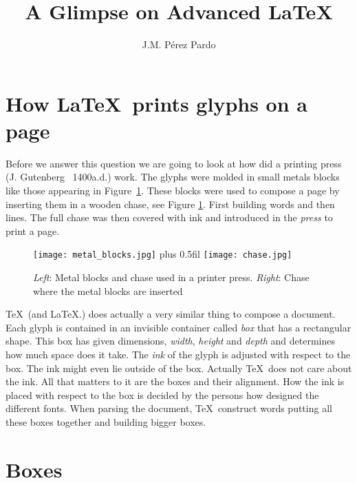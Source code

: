 \documentclass[a4paper]{article}
\title{A Glimpse on Advanced \LaTeX{}}
\author{J.M. Pérez Pardo}
\date{}
\begin{document}
\maketitle

\tableofcontents

\section{How \LaTeX\ prints glyphs on a page}

Before we answer this question we are going to look at how did a printing press (J. Gutenberg ~1400a.d.) work. The glyphs were molded in small metals blocks like those appearing in Figure~\ref{fig:metalblockschase}. These blocks were used to compose a page by inserting them in a wooden chase, see Figure \ref{fig:metalblockschase}. First building words and then lines. The full chase was then covered with ink and introduced in the \emph{press} to print a page.
%
\begin{figure}[h]
  \hfil\vbox{ \hbox{\texttt{[image: metal\_blocks.jpg]}} \vspace{1cm}}\hskip 0pt plus 0.5fil \texttt{[image: chase.jpg]}\hfil
  \caption{\emph{Left}: Metal blocks and chase used in a printer press. \emph{Right}: Chase where the metal blocks are inserted}\label{fig:metalblockschase}
\end{figure}
%

\TeX\ (and \LaTeX{}.) does actually a very similar thing to compose a document. Each glyph is contained in an invisible container called \emph{box} that has a rectangular shape. This box has given dimensions, \emph{width}, \emph{height} and \emph{depth} and determines how much space does it take. The \emph{ink} of the glyph is adjusted with respect to the box. The ink might even lie outside of the box. Actually \TeX\ does not care about the ink. All that matters to it are the boxes and their alignment. How the ink is placed with respect to the box is decided by the persons how designed the different fonts. When parsing the document, \TeX\ construct words putting all these boxes together and building bigger boxes. 

\section{Boxes}
\end{document}
